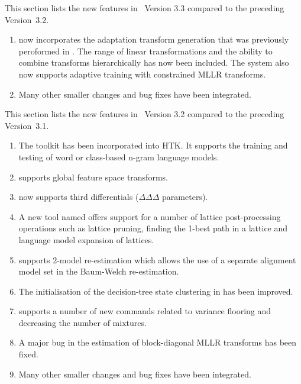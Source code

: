 
This  section lists the new
features in \HTK\ Version 3.3 compared to the preceding Version~3.2.
\begin{enumerate}
\item {} now incorporates the adaptation transform
generation that was previously peroformed in .  The
range of linear transformations and the ability to combine transforms
hierarchically has now been included. The system also now supports 
adaptive training with constrained MLLR transforms.

\item Many other smaller changes and bug fixes have been integrated.
\end{enumerate}


This  section lists the new
features in \HTK\ Version 3.2 compared to the preceding Version~3.1.

\begin{enumerate}
\item The  toolkit has been incorporated into HTK. It
  supports the training and testing of word or class-based n-gram
  language models. 
\item {} supports global feature space transforms.
\item {} now supports third differentials
  ($\Delta\Delta\Delta$ parameters).
\item A new tool named  offers support for a number
  of lattice post-processing operations such as lattice pruning,
  finding the 1-best path in a lattice and language model expansion of
  lattices.
\item {} supports 2-model re-estimation which allows the
  use of a separate alignment model set in the Baum-Welch
  re-estimation.
\item The initialisation of the decision-tree state clustering in
   has been improved.
\item {} supports a number of new commands related to
  variance flooring and decreasing the number of mixtures.
\item A major bug in the estimation of block-diagonal MLLR transforms
  has been fixed.
\item Many other smaller changes and bug fixes have been integrated.
\end{enumerate}

